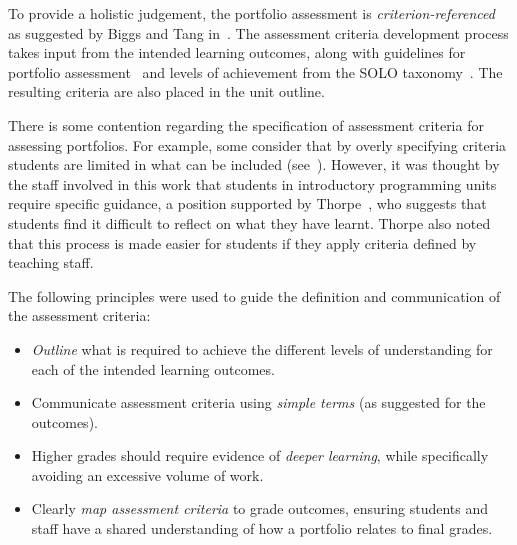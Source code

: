 To provide a holistic judgement, the portfolio assessment is \emph{criterion-referenced} as suggested by Biggs and Tang in~\cite{Biggs:1997}. The assessment criteria development process takes input from the intended learning outcomes, along with guidelines for portfolio assessment~\cite{Biggs:2007} and levels of achievement from the SOLO taxonomy~\cite{Biggs:1982}. The resulting criteria are also placed in the unit outline.

There is some contention regarding the specification of assessment criteria for assessing portfolios. For example, some consider that by overly specifying criteria students are limited in what can be included (see~\cite{Driessen:2005,Tigelaar:2007}). However, it was thought by the staff involved in this work that students in introductory programming units require specific guidance, a position supported by Thorpe~\cite{Thorpe:2000}, who suggests that students find it difficult to reflect on what they have learnt. Thorpe also noted that this process is made easier for students if they apply criteria defined by teaching staff. 

The following principles were used to guide the definition and communication of the assessment criteria:

\begin{itemize}
  \item \emph{Outline} what is required to achieve the different levels of understanding for each of the intended learning outcomes.
  \item Communicate assessment criteria using \emph{simple terms} (as suggested for the outcomes).
  \item Higher grades should require evidence of \emph{deeper learning}, while specifically avoiding an excessive volume of work.
  \item Clearly \emph{map assessment criteria} to grade outcomes, ensuring students and staff have a shared understanding of how a portfolio relates to final grades.
\end{itemize}

